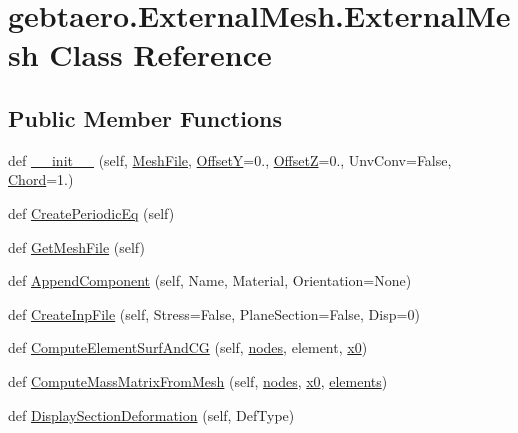 \hypertarget{classgebtaero_1_1_external_mesh_1_1_external_mesh}{}\section{gebtaero.\+External\+Mesh.\+External\+Mesh Class Reference}
\label{classgebtaero_1_1_external_mesh_1_1_external_mesh}
\subsection*{Public Member Functions}
\begin{DoxyCompactItemize}
\item 
def \hyperlink{classgebtaero_1_1_external_mesh_1_1_external_mesh_ad1301073ba0c00d8ad8fe3dc4baa6068}{\+\_\+\+\_\+init\+\_\+\+\_\+} (self, \hyperlink{classgebtaero_1_1_external_mesh_1_1_external_mesh_a53b38c75b026fb6c56b50b2dd9b5270f}{Mesh\+File}, \hyperlink{classgebtaero_1_1_external_mesh_1_1_external_mesh_a87faefe634a474727d516e58eb8bf944}{OffsetY}=0., \hyperlink{classgebtaero_1_1_external_mesh_1_1_external_mesh_a6639038ee73b225cf0d3ea1bd9c52783}{OffsetZ}=0., Unv\+Conv=False, \hyperlink{classgebtaero_1_1_external_mesh_1_1_external_mesh_ac9f8fc4f8dd8e81757bc8a5b2b5323d4}{Chord}=1.)
\item 
def \hyperlink{classgebtaero_1_1_external_mesh_1_1_external_mesh_aea59f570ee7b3c010c86c61384472834}{Create\+Periodic\+Eq} (self)
\item 
def \hyperlink{classgebtaero_1_1_external_mesh_1_1_external_mesh_a9ac15ea158d9eeccf982355c551ae334}{Get\+Mesh\+File} (self)
\item 
def \hyperlink{classgebtaero_1_1_external_mesh_1_1_external_mesh_ad1c3ba8013a6829353d55d9513d49359}{Append\+Component} (self, Name, Material, Orientation=None)
\item 
def \hyperlink{classgebtaero_1_1_external_mesh_1_1_external_mesh_a54e9efc572ecf40516e5c28a48be0bae}{Create\+Inp\+File} (self, Stress=False, Plane\+Section=False, Disp=0)
\item 
def \hyperlink{classgebtaero_1_1_external_mesh_1_1_external_mesh_ad2151661d358ae9a36e05f98a7d29dc8}{Compute\+Element\+Surf\+And\+CG} (self, \hyperlink{classgebtaero_1_1_external_mesh_1_1_external_mesh_abb7c716a5f2adf2a1f878b1034dcdc57}{nodes}, element, \hyperlink{classgebtaero_1_1_external_mesh_1_1_external_mesh_acaa3b125cb4f80848007b82426c14ffa}{x0})
\item 
def \hyperlink{classgebtaero_1_1_external_mesh_1_1_external_mesh_af2195154db17cc393dab153465e33b59}{Compute\+Mass\+Matrix\+From\+Mesh} (self, \hyperlink{classgebtaero_1_1_external_mesh_1_1_external_mesh_abb7c716a5f2adf2a1f878b1034dcdc57}{nodes}, \hyperlink{classgebtaero_1_1_external_mesh_1_1_external_mesh_acaa3b125cb4f80848007b82426c14ffa}{x0}, \hyperlink{classgebtaero_1_1_external_mesh_1_1_external_mesh_a1a044fbcf39f5f8e7d3e3b98d291010d}{elements})
\item 
def \hyperlink{classgebtaero_1_1_external_mesh_1_1_external_mesh_a6cad952ce309870f33277bb9a89c5ca1}{Display\+Section\+Deformation} (self, Def\+Type)
\end{DoxyCompactItemize}
